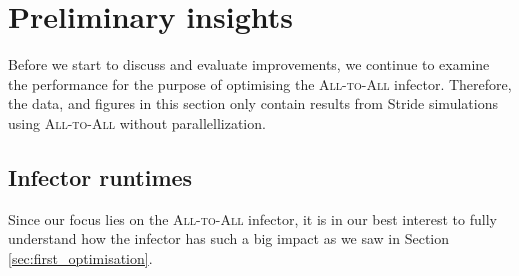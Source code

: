 \section{Preliminary insights}
\label{sec:preliminary_insights}
Before we start to discuss and evaluate improvements, we continue to examine the performance for the purpose of optimising the \textsc{All-to-All} infector. Therefore, the data, and figures in this section only contain results from Stride simulations using \textsc{All-to-All} without parallellization.

\subsection{Infector runtimes}
\label{subsec:infector_runtimes}
Since our focus lies on the \textsc{All-to-All} infector, it is in our best interest to fully understand how the infector has such a big impact as we saw in Section \ref{sec:first_optimisation}.

